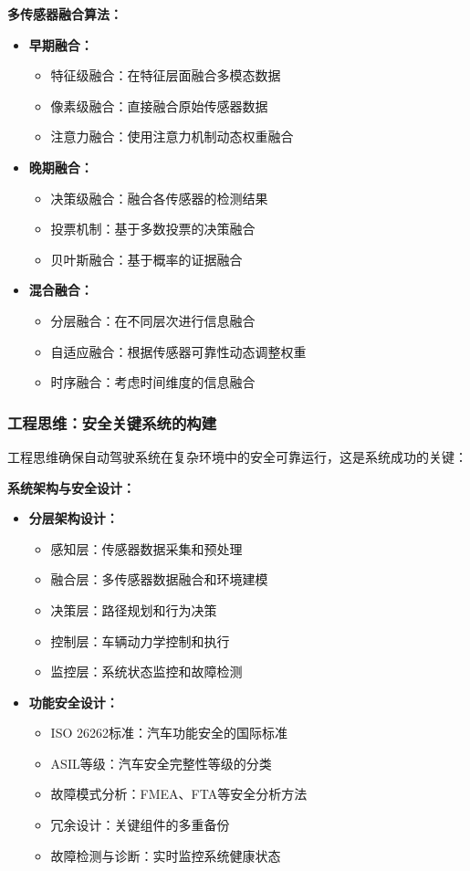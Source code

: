 \textbf{多传感器融合算法：}
\begin{itemize}
\item \textbf{早期融合：}
\begin{itemize}
\item 特征级融合：在特征层面融合多模态数据
\item 像素级融合：直接融合原始传感器数据
\item 注意力融合：使用注意力机制动态权重融合
\end{itemize}
\item \textbf{晚期融合：}
\begin{itemize}
\item 决策级融合：融合各传感器的检测结果
\item 投票机制：基于多数投票的决策融合
\item 贝叶斯融合：基于概率的证据融合
\end{itemize}
\item \textbf{混合融合：}
\begin{itemize}
\item 分层融合：在不同层次进行信息融合
\item 自适应融合：根据传感器可靠性动态调整权重
\item 时序融合：考虑时间维度的信息融合
\end{itemize}
\end{itemize}

\subsubsection{工程思维：安全关键系统的构建}

工程思维确保自动驾驶系统在复杂环境中的安全可靠运行，这是系统成功的关键：

\textbf{系统架构与安全设计：}
\begin{itemize}
\item \textbf{分层架构设计：}
\begin{itemize}
\item 感知层：传感器数据采集和预处理
\item 融合层：多传感器数据融合和环境建模
\item 决策层：路径规划和行为决策
\item 控制层：车辆动力学控制和执行
\item 监控层：系统状态监控和故障检测
\end{itemize}
\item \textbf{功能安全设计：}
\begin{itemize}
\item ISO 26262标准：汽车功能安全的国际标准
\item ASIL等级：汽车安全完整性等级的分类
\item 故障模式分析：FMEA、FTA等安全分析方法
\item 冗余设计：关键组件的多重备份
\item 故障检测与诊断：实时监控系统健康状态
\end{itemize}
\end{itemize}

